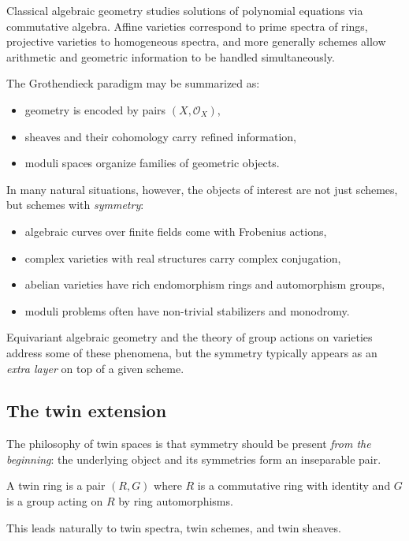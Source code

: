\documentclass[11pt,a4paper]{article}
\numberwithin{equation}{section}
\newcommand{\Ocal}{\mathcal{O}}
\begin{document}
	Classical algebraic geometry studies solutions of polynomial equations via commutative algebra.
	Affine varieties correspond to prime spectra of rings, projective varieties to homogeneous spectra,
	and more generally schemes allow arithmetic and geometric information to be handled simultaneously.
	
	The Grothendieck paradigm may be summarized as:
	\begin{itemize}
		\item geometry is encoded by pairs $(X,\Ocal_X)$,
		\item sheaves and their cohomology carry refined information,
		\item moduli spaces organize families of geometric objects.
	\end{itemize}
	
	In many natural situations, however, the objects of interest are not just schemes, but schemes with 
	\emph{symmetry}:
	\begin{itemize}
		\item algebraic curves over finite fields come with Frobenius actions,
		\item complex varieties with real structures carry complex conjugation,
		\item abelian varieties have rich endomorphism rings and automorphism groups,
		\item moduli problems often have non-trivial stabilizers and monodromy.
	\end{itemize}
	
	Equivariant algebraic geometry and the theory of group actions on varieties address some of these phenomena,
	but the symmetry typically appears as an \emph{extra layer} on top of a given scheme.
	
	\subsection{The twin extension}
	
	The philosophy of twin spaces is that symmetry should be present \emph{from the beginning}:
	the underlying object and its symmetries form an inseparable pair.
	
	\begin{definition}
		A twin ring is a pair $(R,G)$ where $R$ is a commutative ring with identity and $G$ is a group
		acting on $R$ by ring automorphisms.
	\end{definition}
	
	This leads naturally to twin spectra, twin schemes, and twin sheaves.
	
\end{document}
